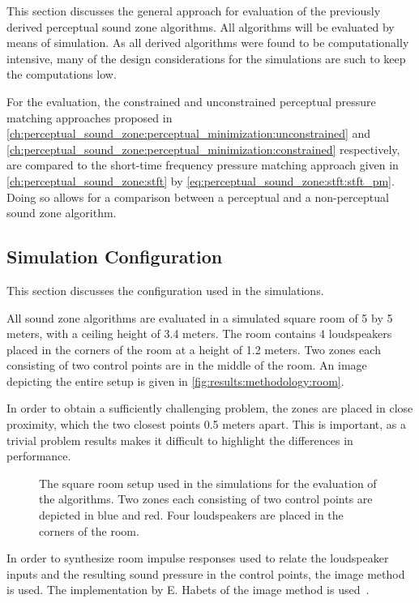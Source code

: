 This section discusses the general approach for evaluation of the previously derived perceptual sound zone algorithms.
All algorithms will be evaluated by means of simulation. 
As all derived algorithms were found to be computationally intensive, many of the design considerations for the simulations
are such to keep the computations low.

For the evaluation, the constrained and unconstrained perceptual pressure matching 
approaches proposed in \autoref{ch:perceptual_sound_zone:perceptual_minimization:unconstrained}
and \autoref{ch:perceptual_sound_zone:perceptual_minimization:constrained} respectively, are compared to the short-time frequency pressure matching approach
given in \autoref{ch:perceptual_sound_zone:stft} by \autoref{eq:perceptual_sound_zone:stft:stft_pm}.
Doing so allows for a comparison between a perceptual and a non-perceptual sound zone algorithm.

\subsection{Simulation Configuration}
This section discusses the configuration used in the simulations.

All sound zone algorithms are evaluated in a simulated square room of 5 by 5 meters, with a ceiling height of 3.4 meters.
The room contains 4 loudspeakers placed in the corners of the room at a height of 1.2 meters.
Two zones each consisting of two control points are in the middle of the room.
An image depicting the entire setup is given in \autoref{fig:results:methodology:room}.

In order to obtain a sufficiently challenging problem, the zones are placed in close proximity, which the two closest points 0.5 meters apart.
This is important, as a trivial problem results makes it difficult to highlight the differences in performance.

\begin{figure}[]
    \centering
    \scalebox{1.0}{}
    \caption{The square room setup used in the simulations for the evaluation of the algorithms.
    Two zones each consisting of two control points are depicted in blue and red. 
    Four loudspeakers are placed in the corners of the room.}
    \label{fig:results:methodology:room}
\end{figure}

In order to synthesize room impulse responses used to relate the loudspeaker inputs and the resulting sound pressure in the control points,
the image method~\cite{allen1979image} is used.
The implementation by E. Habets of the image method is used~\cite{habets2006room}.

